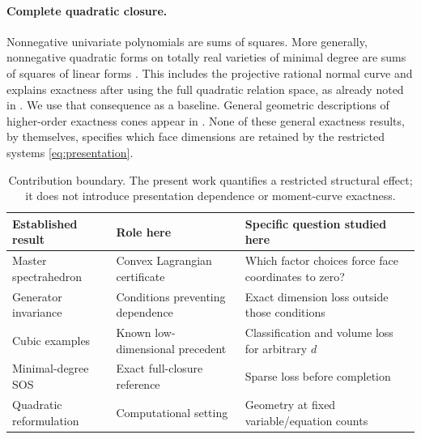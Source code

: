 \documentclass[11pt]{article}
\theoremstyle{definition}\newtheorem{definition}[theorem]{Definition}
\theoremstyle{remark}\newtheorem{remark}[theorem]{Remark}
\begin{document}
\paragraph{Complete quadratic closure.}
Nonnegative univariate polynomials are sums of squares. More generally, nonnegative quadratic forms on totally real varieties of minimal degree are sums of squares of linear forms \cite{bsv}. This includes the projective rational normal curve and explains exactness after using the full quadratic relation space, as already noted in \cite[Remark 6.3]{chs}. We use that consequence as a baseline. General geometric descriptions of higher-order exactness cones appear in \cite{henrion}. None of these general exactness results, by themselves, specifies which face dimensions are retained by the restricted systems \eqref{eq:presentation}.

\begin{table}[t]
\centering\small
\begin{tabular}{p{.23\linewidth}p{.32\linewidth}p{.35\linewidth}}
\toprule
Established result & Role here & Specific question studied here\\\midrule
Master spectrahedron \cite{chs} & Convex Lagrangian certificate & Which factor choices force face coordinates to zero?\\
Generator invariance \cite{lr} & Conditions preventing dependence & Exact dimension loss outside those conditions\\
Cubic examples \cite{chs,voronoi} & Known low-dimensional precedent & Classification and volume loss for arbitrary $d$\\
Minimal-degree SOS \cite{bsv} & Exact full-closure reference & Sparse loss before completion\\
Quadratic reformulation \cite{mk,kac} & Computational setting & Geometry at fixed variable/equation counts\\\bottomrule
\end{tabular}
\caption{Contribution boundary. The present work quantifies a restricted structural effect; it does not introduce presentation dependence or moment-curve exactness.}\label{tab:prior}
\end{table}
\end{document}

